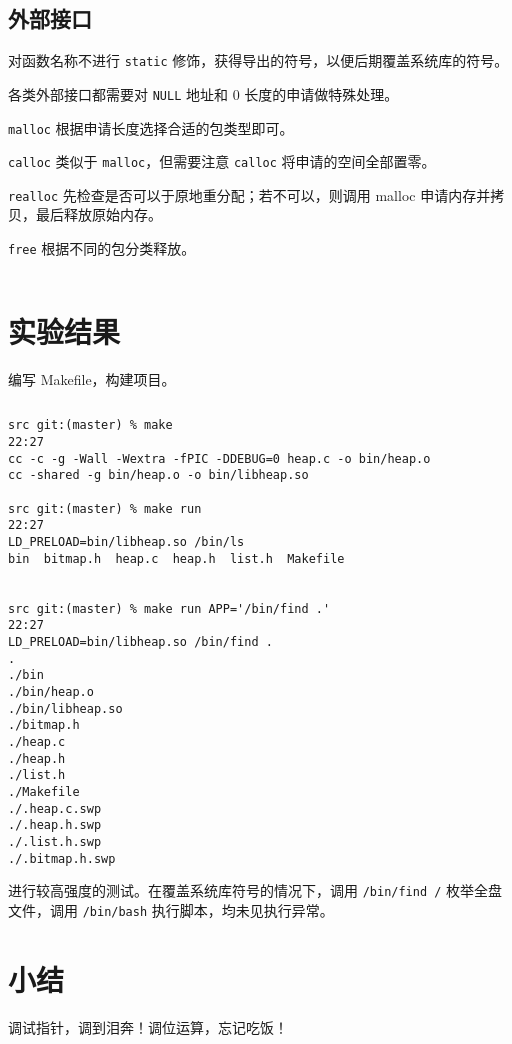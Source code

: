 \documentclass[12pt, a4paper]{article}
\newcommand{\LabSrc}[1]{\inputminted[fontsize=\scriptsize, breaklines]{c}{./src/#1.c}}
\begin{document}
\LabSrc{buck_alloc}

\subsection{外部接口}
对函数名称不进行 \texttt{static} 修饰，获得导出的符号，以便后期覆盖系统库的符号。

各类外部接口都需要对 \texttt{NULL} 地址和 0 长度的申请做特殊处理。

\texttt{malloc} 根据申请长度选择合适的包类型即可。

\texttt{calloc} 类似于 \texttt{malloc}，但需要注意 \texttt{calloc} 将申请的空间全部置零。

\texttt{realloc} 先检查是否可以于原地重分配；若不可以，则调用 malloc 申请内存并拷贝，最后释放原始内存。

\texttt{free} 根据不同的包分类释放。

\LabSrc{interface}

\section{实验结果}

编写 Makefile，构建项目。

\inputminted[fontsize=\scriptsize, breaklines]{makefile}{../src/Makefile}

{\scriptsize
\begin{verbatim}
src git:(master) % make                                                          22:27
cc -c -g -Wall -Wextra -fPIC -DDEBUG=0 heap.c -o bin/heap.o
cc -shared -g bin/heap.o -o bin/libheap.so

src git:(master) % make run                                                      22:27
LD_PRELOAD=bin/libheap.so /bin/ls
bin  bitmap.h  heap.c  heap.h  list.h  Makefile


src git:(master) % make run APP='/bin/find .'                                    22:27
LD_PRELOAD=bin/libheap.so /bin/find .
.
./bin
./bin/heap.o
./bin/libheap.so
./bitmap.h
./heap.c
./heap.h
./list.h
./Makefile
./.heap.c.swp
./.heap.h.swp
./.list.h.swp
./.bitmap.h.swp
\end{verbatim}
}

进行较高强度的测试。在覆盖系统库符号的情况下，调用 \texttt{/bin/find /} 枚举全盘文件，调用 \texttt{/bin/bash} 执行脚本，均未见执行异常。

\section{小结}
调试指针，调到泪奔！调位运算，忘记吃饭！
\end{document}
